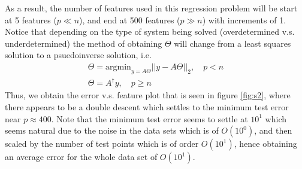\documentclass{article}
\begin{document}
As a result, the number of features used in this regression problem will be
start at 5 features ($p \ll n$), and end at 500 features ($p \gg n$) with
increments of 1. Notice
that depending on the type of system being solved (overdetermined v.s.
underdetermined) the method of obtaining $\Theta$ will change from a least
squares solution to a psuedoinverse solution, i.e.
\begin{gather*}
    \Theta = \text{argmin}_{y = A\Theta} ||y - A\Theta||_2, \quad p < n\\
    \Theta = A^{\dagger}y, \quad p \ge n
\end{gather*}
Thus, we obtain the error v.s. feature plot that is seen in figure \ref{fig:s2},
where there appears to be a double descent which settles to the minimum test
error near $p \approx 400$. Note that the minimum test error seems to settle at
$10^1$ which seems natural due to the noise in the data sets which is of $O(10^0)$,
and then scaled by the number of test points which is of order $O(10^1)$, hence
obtaining an average error for the whole data set of $O(10^1)$. 
\end{document}
